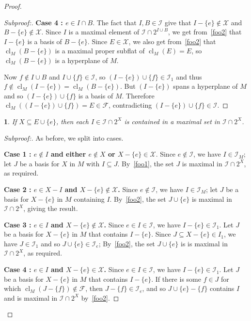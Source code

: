 \documentclass{amsart}
\theoremstyle{plain}
\newtheorem{claim}{}[theorem]
\theoremstyle{definition}
\newcommand{\cF}{\mathcal{F}}
\newcommand{\cI}{\mathcal{I}}
\newcommand{\cX}{\mathcal{X}}
\DeclareMathOperator{\cl}{cl}
\renewcommand{\ss}{\subseteq}
\newenvironment{subproof}[1][\proofname]{%
  \renewcommand{\qedsymbol}{$\blacksquare$}%
  \begin{proof}[Subproof:]%
}{%
  \end{proof}%
}
\begin{document}
\begin{proof}
\begin{subproof}
    \textbf{Case 4 : $e \in I \cap B$}. 
    The fact that $I,B \in \cI$ give that $I - \{e\} \notin \cX$ and $B - \{e\} \notin \cX$. 
    Since $I$ is a maximal element of $\cI \cap 2^{I \cup B}$, we get from~\ref{foo2} that 
    $I - \{e\}$ is a basis of $B - \{e\}$. Since $E \in \cX$, we also get from~\ref{foo2}
    that $\cl_M(B - \{e\})$ is a maximal proper subflat of $\cl_M(E) = E$, so 
    $\cl_M(B - \{e\})$ is a hyperplane of $M$.

    Now $f \notin I \cup B$ and $I \cup \{f\} \in \cI$, so $(I - \{e\}) \cup \{f\} \in \cI_1$
    and thus $f \notin \cl_M(I  - \{e\}) = \cl_M(B - \{e\})$. But $(I - \{e\})$ spans
    a hyperplane of $M$ and so $(I - \{e\}) \cup \{f\}$ is a basis of $M$. 
    Therefore $\cl_M((I - \{e\}) \cup \{f\}) = E \in \cF$, 
    contradicting $(I - \{e\}) \cup \{f\} \in \cI$. 
  \end{subproof}
  
  \begin{claim}
    If $X \ss E \cup \{e\}$, then each $I \in \cI \cap 2^X$ is contained in a maximal set in $\cI \cap 2^X$. 
  \end{claim}
  \begin{subproof}
    As before, we split into cases. 

    \textbf{Case 1 : $e \notin I$ and either $e \notin X$ or $X - \{e\} \in \cX$}.
    Since $e \notin \cI$, we have $I \in \cI_M$; let $J$ be a basis for $X$ in $M$ with $I \ss J$. 
    By~\ref{foo1}, the set $J$ is maximal in $\cI \cap 2^X$, as required. 

    \textbf{Case 2 : $e \in X - I$ and $X - \{e\} \notin \cX$.}
    Since $e \notin \cI$, we have $I \in \cI_M$; 
    let $J$ be a basis for $X - \{e\}$ in $M$ containing $I$. By~\ref{foo2}, the set $J \cup \{e\}$ 
    is maximal in $\cI \cap 2^X$, giving the result. 

    \textbf{Case 3 : $e \in I$ and $X - \{e\} \notin \cX$.}
    Since $e \in I \in \cI$, we have $I - \{e\} \in \cI_1$. Let $J$ be a basis for $X - \{e\}$ 
    in $M$ that contains $I - \{e\}$. 
    Since $J \ss X - \{e\} \in I_1$, we have $J \in \cI_1$ and so $J \cup \{e\} \in \cI_e$;
    By~\ref{foo2}, the set $J \cup \{e\}$ is 
    is maximal in $\cI \cap 2^X$, as required. 

    \textbf{Case 4 : $e \in I$ and $X - \{e\} \in \cX$.}
    Since $e \in I \in \cI$, we have $I - \{e\} \in \cI_1$. Let $J$ be a basis for $X - \{e\}$ 
    in $M$ that contains $I - \{e\}$. If there is some $f \in J$ for which 
    $\cl_M(J - \{f\}) \notin \cF$, then $J - \{f\} \in \cI_e$, 
    and so $J \cup \{e\}  - \{f\}$ contains $I$ and  is maximal in $\cI \cap 2^X$ by~\ref{foo2}. 


\end{subproof}
\end{proof}
\end{document}
